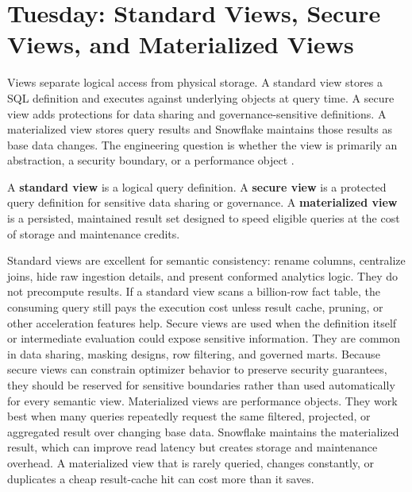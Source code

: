 \section{Tuesday: Standard Views, Secure Views, and Materialized Views}
Views separate logical access from physical storage. A standard view stores a SQL definition and executes against underlying objects at query time. A secure view adds protections for data sharing and governance-sensitive definitions. A materialized view stores query results and Snowflake maintains those results as base data changes. The engineering question is whether the view is primarily an abstraction, a security boundary, or a performance object \cite{snowflakeViewsDocs,snowflakeSecureViewsDocs,snowflakeMaterializedViewsDocs}.
\begin{definitionbox}
A \textbf{standard view} is a logical query definition. A \textbf{secure view} is a protected query definition for sensitive data sharing or governance. A \textbf{materialized view} is a persisted, maintained result set designed to speed eligible queries at the cost of storage and maintenance credits.
\end{definitionbox}
Standard views are excellent for semantic consistency: rename columns, centralize joins, hide raw ingestion details, and present conformed analytics logic. They do not precompute results. If a standard view scans a billion-row fact table, the consuming query still pays the execution cost unless result cache, pruning, or other acceleration features help.
Secure views are used when the definition itself or intermediate evaluation could expose sensitive information. They are common in data sharing, masking designs, row filtering, and governed marts. Because secure views can constrain optimizer behavior to preserve security guarantees, they should be reserved for sensitive boundaries rather than used automatically for every semantic view.
Materialized views are performance objects. They work best when many queries repeatedly request the same filtered, projected, or aggregated result over changing base data. Snowflake maintains the materialized result, which can improve read latency but creates storage and maintenance overhead. A materialized view that is rarely queried, changes constantly, or duplicates a cheap result-cache hit can cost more than it saves.
